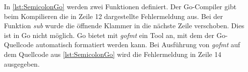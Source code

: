 In \autoref{lst:SemicolonGo} werden zwei Funktionen definiert. 
Der Go-Compiler gibt beim Kompilieren die in Zeile 12 dargestellte Fehlermeldung aus.
Bei der Funktion \emph{sub} wurde die öffnende Klammer in die nächste Zeile verschoben.
Dies ist in Go nicht möglich. 
Go bietet mit \emph{gofmt} ein Tool an, mit dem der Go-Quellcode automatisch formatiert werden kann. Bei Ausführung von \emph{gofmt} auf dem Quellcode aus \autoref{lst:SemicolonGo} wird die Fehlermeldung in Zeile 14 ausgegeben. 

